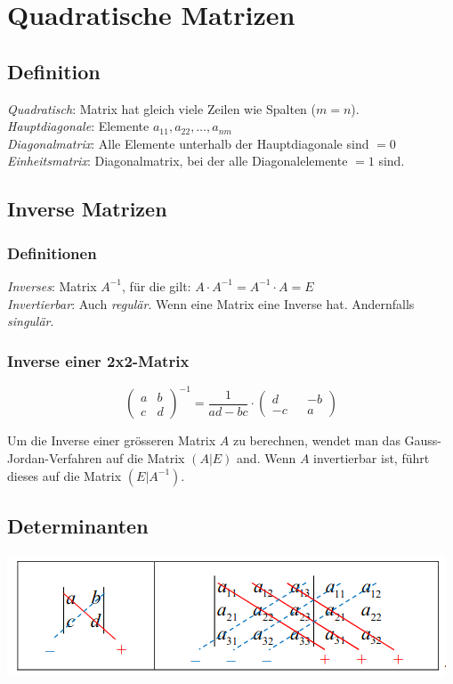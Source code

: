 \newpage
\section{Quadratische Matrizen}
\subsection{Definition}
\textit{Quadratisch}: Matrix hat gleich viele Zeilen wie Spalten ($m=n$). \\
\textit{Hauptdiagonale}: Elemente $a_{11}, a_{22}, \dots, a_{n m}$ \\
\textit{Diagonalmatrix}: Alle Elemente unterhalb der Hauptdiagonale sind $=0$ \\
\textit{Einheitsmatrix}: Diagonalmatrix, bei der alle Diagonalelemente $=1$ sind.

\subsection{Inverse Matrizen}
\subsubsection{Definitionen}%
\label{ssub:Definitionen}
\textit{Inverses}: Matrix $A^{-1}$, für die gilt: $A \cdot A^{-1} = A^{-1} \cdot A = E$ \\
\textit{Invertierbar}: Auch \textit{regulär}. Wenn eine Matrix eine Inverse hat. Andernfalls \textit{singulär}.

\subsubsection{Inverse einer 2x2-Matrix}%
\begin{equation*}
\begin{pmatrix}
  a & b \\
  c & d
\end{pmatrix}^{-1}
= \frac{1}{ad-bc} \cdot 
\begin{pmatrix}
  d && -b \\
  -c && a
\end{pmatrix}
\end{equation*}

Um die Inverse einer grösseren Matrix $A$ zu berechnen, wendet man das Gauss-Jordan-Verfahren auf die Matrix $(A|E)$ and. Wenn $A$ invertierbar ist, führt dieses auf die Matrix $(E|A^{-1})$.

\subsection{Determinanten}
\begin{center}
  \includegraphics[width=0.7\linewidth]{images/determinante.png}
\end{center}


